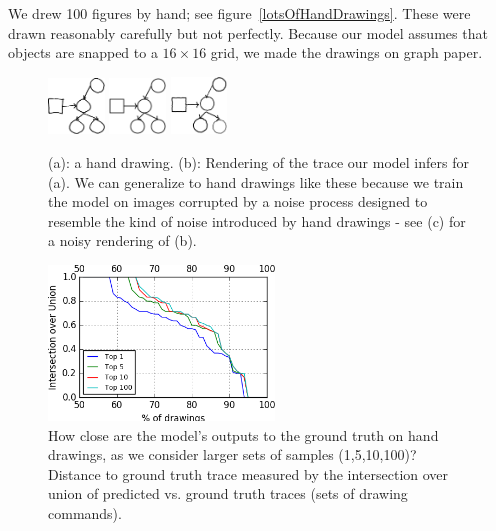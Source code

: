 \documentclass{article}
\begin{document}
We drew 100 figures by hand; see figure~\ref{lotsOfHandDrawings}.
These were drawn reasonably carefully but not perfectly.
Because our model assumes that objects are snapped to a $16\times 16$ grid,
we made the drawings on graph paper.
\begin{figure}\centering
  \begin{minipage}{0.45\textwidth}
  \begin{minipage}[t]{0.3\textwidth}\includegraphics[width = 1.5cm]{figures/expert-60-reduced.png}
    \subcaption{}
  \end{minipage}%
   \begin{minipage}[t]{0.3\textwidth}\includegraphics[width = 1.5cm]{figures/60-groundTruth-reduced.png}
    \subcaption{}
  \end{minipage}%
  \begin{minipage}[t]{0.3\textwidth}\includegraphics[width = 1.5cm]{figures/60-1-reduced.png}
    \subcaption{}
  \end{minipage}%
    \caption{(a): a hand drawing. (b): Rendering of the trace our model infers for (a). We can generalize to hand drawings like these because we train the model on images corrupted by a noise process designed to resemble the kind of noise introduced by hand drawings - see (c) for a noisy rendering of (b).}\label{handDrawingExamples}
  \end{minipage}\hfill
  \begin{minipage}{0.45\textwidth}
  \includegraphics[width = 6cm]{figures/drawingAccuracy.png}
  \caption{How close are the model's outputs to the ground truth on hand drawings, as we consider larger sets of samples (1,5,10,100)?
  Distance to ground truth trace measured by the intersection over union of predicted vs. ground truth traces (sets of drawing commands).}\label{drawingIntersectionOverUnion}
    \end{minipage}
\end{figure}
\end{document}
